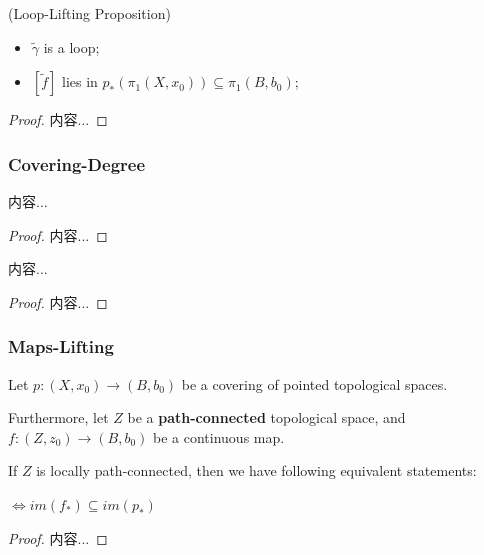 \documentclass[Total.tex]{subfiles}
\begin{document}
			\begin{proposition}
				(Loop-Lifting Proposition)
				
				\begin{itemize}
					\item $\tilde{\gamma}$ is a loop;
					\item $[\tilde{f}]$ lies in $p_*(\pi_1(X,x_0))\subseteq \pi_1(B,b_0)$;
				\end{itemize}
			\end{proposition}
			\begin{proof}
				内容...
			\end{proof}
			\subsubsection{Covering-Degree}
			\begin{proposition}
				内容...
			\end{proposition}
			\begin{proof}
				内容...
			\end{proof}
			
			\begin{proposition}
				内容...
			\end{proposition}
			\begin{proof}
				内容...
			\end{proof}
			\subsubsection{Maps-Lifting}
			\begin{proposition}
				Let $p:(X,x_0)\rightarrow (B,b_0)$ be a covering of pointed topological spaces. 
				
				Furthermore, let $Z$ be a \textbf{path-connected} topological space, and $f:(Z,z_0)\rightarrow (B,b_0)$ be a continuous map. 
				
				If $Z$ is locally path-connected, then we have following equivalent statements:
				\begin{center}
					$\Leftrightarrow im(f_*)\subseteq im(p_*)$ 
				\end{center}
			\end{proposition}
			\begin{proof}
				内容...
			\end{proof}
\end{document}
